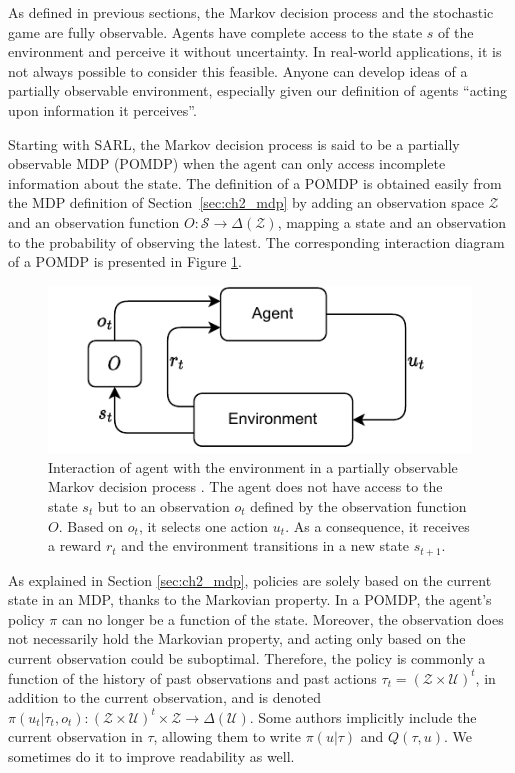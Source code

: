 As defined in previous sections, the Markov decision process and the stochastic game are fully observable.
Agents have complete access to the state $s$ of the environment and perceive it without uncertainty.
In real-world applications, it is not always possible to consider this feasible.
Anyone can develop ideas of a partially observable environment, especially given our definition of agents ``acting upon information it perceives''.

Starting with SARL, the Markov decision process is said to be a partially observable MDP (POMDP) \citep{KAELBLING199899} when the agent can only access incomplete information about the state.
The definition of a POMDP is obtained easily from the MDP definition of Section~\ref{sec:ch2_mdp} by adding an observation space $\mathcal{Z}$ and an observation function $O:\mathcal{S} \rightarrow \Delta(\mathcal{Z})$, mapping a state and an observation to the probability of observing the latest.
The corresponding interaction diagram of a POMDP is presented in Figure \ref{fig:ch2_pomdp}.

\begin{figure}
    \centering
    \includegraphics[width=.8\linewidth]{tex_thesis/figures/ch2/POMDP.pdf}
    \caption{Interaction of agent with the environment in a partially observable Markov decision process \citep{KAELBLING199899}. The agent does not have access to the state $s_t$ but to an observation $o_t$ defined by the observation function $O$. Based on $o_t$, it selects one action $u_t$. As a consequence, it receives a reward $r_t$ and the environment transitions in a new state $s_{t+1}$.}
    \label{fig:ch2_pomdp}
\end{figure}

As explained in Section \ref{sec:ch2_mdp}, policies are solely based on the current state in an MDP, thanks to the Markovian property.
In a POMDP, the agent's policy $\pi$ can no longer be a function of the state.
Moreover, the observation does not necessarily hold the Markovian property, and acting only based on the current observation could be suboptimal.
Therefore, the policy is commonly a function of the history of past observations and past actions $\tau_t=(\mathcal{Z} \times \mathcal{U})^t$, in addition to the current observation, and is denoted $\pi(u_t|\tau_t,o_t): (\mathcal{Z} \times \mathcal{U})^t \times \mathcal{Z} \rightarrow \Delta(\mathcal{U})$.
Some authors implicitly include the current observation in $\tau$, allowing them to write $\pi(u|\tau)$ and $Q(\tau,u)$.
We sometimes do it to improve readability as well.

